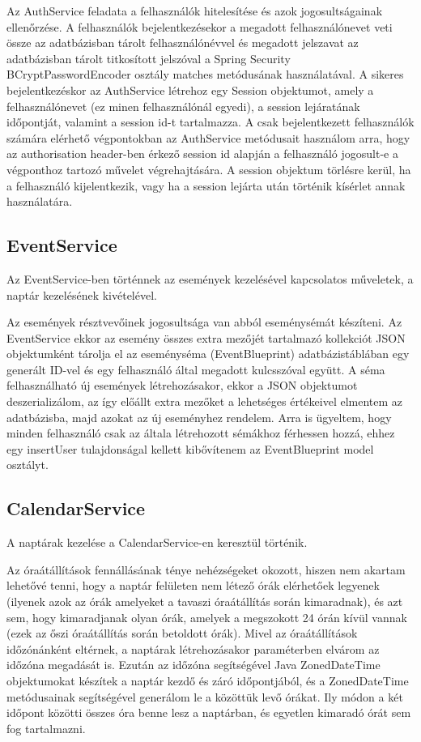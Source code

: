 \documentclass[a4paper,12pt]{report}
\theoremstyle{definition}
\theoremstyle{remark}
\begin{document}
Az AuthService feladata a felhasználók hitelesítése és azok jogosultságainak ellenőrzése. A felhasználók bejelentkezésekor a megadott felhasználónevet veti össze az adatbázisban tárolt felhasználónévvel és megadott jelszavat az adatbázisban tárolt titkosított jelszóval a Spring Security BCryptPasswordEncoder osztály matches metódusának használatával. A sikeres bejelentkezéskor az AuthService létrehoz egy Session objektumot, amely a felhasználónevet (ez minen felhasználónál egyedi), a session lejáratának időpontját, valamint a session id-t tartalmazza.  A csak bejelentkezett felhasználók számára elérhető végpontokban az AuthService metódusait használom arra, hogy az authorisation header-ben érkező session id alapján a felhasználó jogosult-e a végponthoz tartozó művelet végrehajtására. A session objektum törlésre kerül, ha a felhasználó kijelentkezik, vagy ha a session lejárta után történik kísérlet annak használatára.

\subsection{EventService}

Az EventService-ben történnek az események kezelésével kapcsolatos műveletek, a naptár kezelésének kivételével. 

Az események résztvevőinek jogosultsága van abból eseménysémát készíteni. Az EventService ekkor az esemény összes extra mezőjét tartalmazó kollekciót JSON objektumként tárolja el az eseményséma (EventBlueprint) adatbázistáblában egy generált ID-vel és egy felhasználó által megadott kulcsszóval együtt. A séma felhasználható új események létrehozásakor, ekkor a JSON objektumot deszerializálom, az így előállt extra mezőket a lehetséges értékeivel elmentem az adatbázisba, majd azokat az új eseményhez rendelem. Arra is ügyeltem, hogy minden felhasználó csak az általa létrehozott sémákhoz férhessen hozzá, ehhez egy insertUser tulajdonságal kellett kibővítenem az EventBlueprint model osztályt.

\subsection{CalendarService}

A naptárak kezelése a CalendarService-en keresztül történik.

Az óraátállítások fennállásának ténye nehézségeket okozott, hiszen nem akartam lehetővé tenni, hogy a naptár felületen nem létező órák elérhetőek legyenek (ilyenek azok az órák amelyeket a tavaszi óraátállítás során kimaradnak), és azt sem, hogy kimaradjanak olyan órák, amelyek a megszokott 24 órán kívül vannak (ezek az őszi óraátállítás során betoldott órák). Mivel az óraátállítások időzónánként eltérnek, a naptárak létrehozásakor paraméterben elvárom az időzóna megadását is. Ezután az időzóna segítségével Java ZonedDateTime objektumokat készítek a naptár kezdő és záró időpontjából, és a ZonedDateTime metódusainak segítségével generálom le a közöttük levő órákat. Ily módon a két időpont közötti összes óra benne lesz a naptárban, és egyetlen kimaradó órát sem fog tartalmazni.
\end{document}
